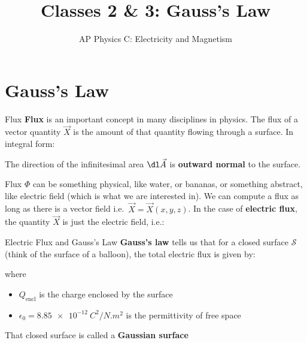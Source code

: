 \documentclass[12pt,aspectratio=169]{beamer}
\title{Classes 2 \& 3: Gauss's Law}
\subtitle{AP Physics C: Electricity and Magnetism}
\begin{document}
\begin{frame}
  \maketitle
\end{frame}


\section{Gauss's Law}

\begin{frame}{Flux}
  \textbf{Flux} is an important concept in many disciplines in physics. The
  flux of a vector quantity $\vec X$ is the amount of that quantity flowing
  through a surface. In integral form:


  The direction of the infinitesimal area $\dl\vec A$ is \textbf{outward normal}
  to the surface.
  \begin{center}
  \end{center}
\end{frame}



\begin{frame}{Flux}
  \vspace{.2in}$\Phi$ can be something physical, like water, or bananas, or
  something abstract, like electric field (which is what we are interested
  in). We can compute a flux as long as there is a vector field i.e.\
  $\vec X=\vec X(x,y,z)$. In the case of \textbf{electric flux}, the quantity
  $\vec X$ is just the electric field, i.e.:
    
  \begin{center}
  \end{center}
\end{frame}



\begin{frame}{Electric Flux and Gauss's Law}
  \textbf{Gauss's law} tells us that for a closed surface $\mathcal S$ (think
  of the surface of a balloon), the total electric flux is given by:

    
  where
  \begin{itemize}
  \item $Q_\text{encl}$ is the charge enclosed by the surface
  \item $\epsilon_0=\SI{8.85e-12}{C^2/N.m^2}$ is the permittivity of free space
  \end{itemize}
  That closed surface is called a \textbf{Gaussian surface}
\end{frame}
\end{document}
